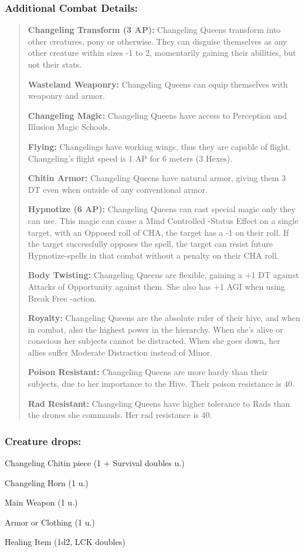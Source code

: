\documentclass[11pt,a4paper,twocolumn]{book}
\begin{document}
	\subsubsection*{Additional Combat Details:}
	\begin{verse}
		\textbf{Changeling Transform (3 AP):} Changeling Queens transform into other creatures, pony or otherwise. They can disguise themselves as any other creature within sizes -1 to 2, momentarily gaining their abilities, but not their stats.
		
		\textbf{Wasteland Weaponry:} Changeling Queens can equip themselves with weaponry and armor.
		
		\textbf{Changeling Magic:} Changeling Queens have access to Perception and Illusion Magic Schools.
		
		\textbf{Flying:} Changelings have working wings, thus they are capable of flight. Changeling's flight speed is 1 AP for 6 meters (3 Hexes). 
		
		\textbf{Chitin Armor:} Changeling Queens have natural armor, giving them 3 DT even when outside of any conventional armor.
		
		\textbf{Hypnotize (6 AP):} Changeling Queens can cast special magic only they can use. This magic can cause a Mind Controlled -Status Effect on a single target, with an Opposed roll of CHA, the target has a -1 on their roll. If the target successfully opposes the spell, the target can resist future Hypnotize-spells in that combat without a penalty on their CHA roll.
		
		\textbf{Body Twisting:} Changeling Queens are flexible, gaining a +1 DT against Attacks of Opportunity against them. She also has +1 AGI when using Break Free -action.
		
		\textbf{Royalty:} Changeling Queens are the absolute ruler of their hive, and when in combat, also the highest power in the hierarchy. When she's alive or conscious her subjects cannot be distracted. When she goes down, her allies suffer Moderate Distraction instead of Minor.
		
		\textbf{Poison Resistant:} Changeling Queens are more hardy than their subjects, due to her importance to the Hive. Their poison resistance is 40.
		
		\textbf{Rad Resistant:} Changeling Queens have higher tolerance to Rads than the drones she commands. Her rad resistance is 40.
	\end{verse}
	
	\subsubsection*{Creature drops:}
	\begin{compactitem}
		\item Changeling Chitin piece (1 + Survival doubles u.)
		\item Changeling Horn (1 u.)
		\item Main Weapon (1 u.)
		\item Armor or Clothing (1 u.)
		\item Healing Item (1d2, LCK doubles)
	\end{compactitem}
	
\end{document}
